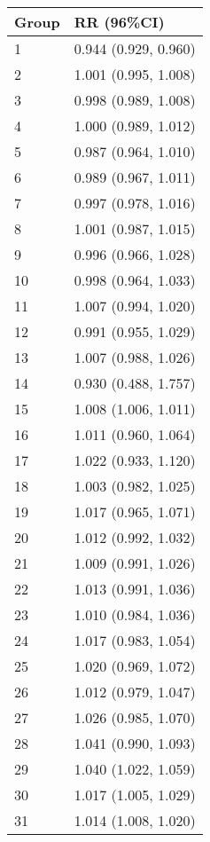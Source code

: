 \begin{tabular}{ll}
  \hline
Group & RR (96\%CI) \\ 
  \hline
   1 & 0.944 (0.929, 0.960) \\ 
     2 & 1.001 (0.995, 1.008) \\ 
     3 & 0.998 (0.989, 1.008) \\ 
     4 & 1.000 (0.989, 1.012) \\ 
     5 & 0.987 (0.964, 1.010) \\ 
     6 & 0.989 (0.967, 1.011) \\ 
     7 & 0.997 (0.978, 1.016) \\ 
     8 & 1.001 (0.987, 1.015) \\ 
     9 & 0.996 (0.966, 1.028) \\ 
    10 & 0.998 (0.964, 1.033) \\ 
    11 & 1.007 (0.994, 1.020) \\ 
    12 & 0.991 (0.955, 1.029) \\ 
    13 & 1.007 (0.988, 1.026) \\ 
    14 & 0.930 (0.488, 1.757) \\ 
    15 & 1.008 (1.006, 1.011) \\ 
    16 & 1.011 (0.960, 1.064) \\ 
    17 & 1.022 (0.933, 1.120) \\ 
    18 & 1.003 (0.982, 1.025) \\ 
    19 & 1.017 (0.965, 1.071) \\ 
    20 & 1.012 (0.992, 1.032) \\ 
    21 & 1.009 (0.991, 1.026) \\ 
    22 & 1.013 (0.991, 1.036) \\ 
    23 & 1.010 (0.984, 1.036) \\ 
    24 & 1.017 (0.983, 1.054) \\ 
    25 & 1.020 (0.969, 1.072) \\ 
    26 & 1.012 (0.979, 1.047) \\ 
    27 & 1.026 (0.985, 1.070) \\ 
    28 & 1.041 (0.990, 1.093) \\ 
    29 & 1.040 (1.022, 1.059) \\ 
    30 & 1.017 (1.005, 1.029) \\ 
    31 & 1.014 (1.008, 1.020) \\ 
   \hline
\end{tabular}

